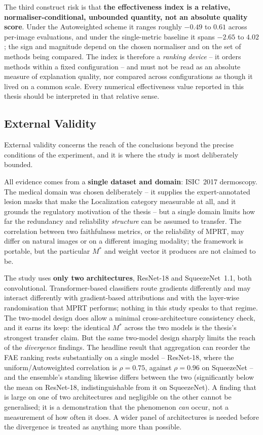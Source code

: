 The third construct risk is that \textbf{the effectiveness index is a relative,
normaliser-conditional, unbounded quantity, not an absolute quality score}.
Under the Autoweighted scheme it ranges roughly $-0.49$ to $0.61$ across
per-image evaluations,
and under the single-metric baseline it spans $-2.65$ to $4.02$; the sign and
magnitude depend on the chosen normaliser and on the set of methods being
compared. The index is therefore a \emph{ranking device} -- it orders methods
within a fixed configuration -- and must not be read as an absolute measure of
explanation quality, nor compared across configurations as though it lived on a
common scale. Every numerical effectiveness value reported in this thesis should
be interpreted in that relative sense.

\subsection{External Validity}

External validity concerns the reach of the conclusions beyond the precise
conditions of the experiment, and it is where the study is most deliberately
bounded.

All evidence comes from a \textbf{single dataset and domain}: ISIC~2017
dermoscopy. The medical domain was chosen deliberately -- it supplies the
expert-annotated lesion masks that make the Localization category measurable at
all, and it grounds the regulatory motivation of the thesis -- but a single
domain limits how far the redundancy and reliability \emph{structure} can be
assumed to transfer. The correlation between two faithfulness metrics, or the
reliability of MPRT, may differ on natural images or on a different imaging
modality; the framework is portable, but the particular $M^{*}$ and weight
vector it produces are not claimed to be.

The study uses \textbf{only two architectures}, ResNet-18 and SqueezeNet~1.1,
both convolutional. Transformer-based classifiers route gradients differently
and may interact differently with gradient-based attributions and with the
layer-wise randomisation that MPRT performs; nothing in this study speaks to
that regime. The two-model design does allow a minimal cross-architecture
consistency check, and it earns its keep: the identical $M^{*}$ across the two
models is the thesis's strongest transfer claim. But the same two-model design
sharply limits the reach of the \emph{divergence} findings. The headline result
that aggregation can reorder the FAE ranking rests substantially on a single
model -- ResNet-18, where the uniform/Autoweighted correlation is $\rho = 0.75$,
against $\rho = 0.96$ on SqueezeNet -- and the ensemble's standing likewise
differs between the two (significantly below the mean on ResNet-18,
indistinguishable from it on SqueezeNet).
A finding that is large on one of two architectures and negligible on the other
cannot be generalised; it is a demonstration that the phenomenon \emph{can}
occur, not a measurement of how often it does. A wider panel of architectures is
needed before the divergence is treated as anything more than possible.


